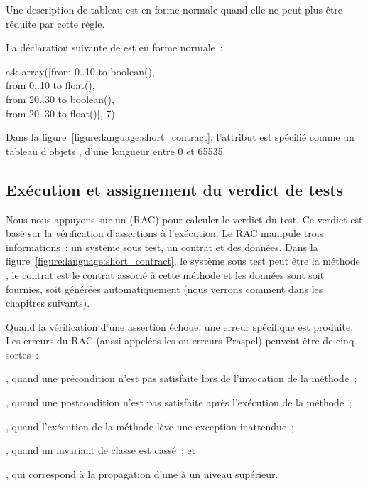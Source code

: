 Une description de tableau est en forme normale quand elle ne peut plus être
réduite par cette règle.

\begin{example}

La déclaration suivante de  est en forme normale~:

\begin{pre}
a4: array([from  0..10 to boolean(), \\
           from  0..10 to float(), \\
           from 20..30 to boolean(), \\
           from 20..30 to float()], 7)
\end{pre}

\end{example}

Dans la figure~\ref{figure:language:short_contract}, l'attribut  est
spécifié comme un tableau d'objets , d'une longueur entre 0 et 65535.

\subsection{Exécution et assignement du verdict de tests}
\label{subsection:language:verdict}

Nous nous appuyons sur un  (RAC) pour
calculer le verdict du test. Ce verdict est basé sur la vérification
d'assertions à l'exécution. Le RAC manipule trois informations~: un système sous
test, un contrat et des données. Dans la
figure~\ref{figure:language:short_contract}, le système sous test peut être la
méthode , le contrat est le contrat associé à cette méthode et les
données sont soit fournies, soit générées automatiquement (nous verrons comment
dans les chapitres suivants).

Quand la vérification d'une assertion échoue, une erreur spécifique est
produite. Les erreurs du RAC (aussi appelées les 
ou erreurs Praspel) peuvent être de cinq sortes~:
%
\begin{inparaenum}[$(i)$]
%
\item {}, quand une précondition n'est pas
satisfaite lors de l'invocation de la méthode~;
%
\item {}, quand une postcondition n'est pas
satisfaite après l'exécution de la méthode~;
%
\item {}, quand l'exécution de la méthode lève une
exception inattendue~;
%
\item {}, quand un invariant de classe est cassé~; et
%
\item {}, qui correspond à la propagation
d'une  à un niveau supérieur.
%
\end{inparaenum}

